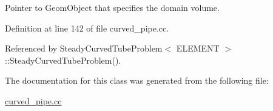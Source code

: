 Pointer to Geom\+Object that specifies the domain volume. 



Definition at line 142 of file curved\+\_\+pipe.\+cc.



Referenced by Steady\+Curved\+Tube\+Problem$<$ E\+L\+E\+M\+E\+N\+T $>$\+::\+Steady\+Curved\+Tube\+Problem().



The documentation for this class was generated from the following file\+:\begin{DoxyCompactItemize}
\item 
\hyperlink{curved__pipe_8cc}{curved\+\_\+pipe.\+cc}\end{DoxyCompactItemize}
